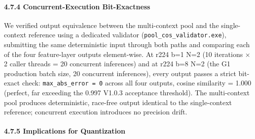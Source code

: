 \documentclass[
]{article}
\begin{document}
\paragraph{4.7.4 Concurrent-Execution
Bit-Exactness}\label{474-concurrent-execution-bit-exactness}

We verified output equivalence between the multi-context pool and the
single-context reference using a dedicated validator
(\texttt{pool\_cos\_validator.exe}), submitting the same deterministic
input through both paths and comparing each of the four feature-layer
outputs element-wise. At r224 b=1 N=2 (10 iterations × 2 caller threads
= 20 concurrent inferences) and at r224 b=8 N=2 (the G1 production batch
size, 20 concurrent inferences), every output passes a strict bit-exact
check: \texttt{max\_abs\_error\ =\ 0} across all four outputs, cosine
similarity = 1.000 (perfect, far exceeding the 0.997 V1.0.3 acceptance
threshold). The multi-context pool produces deterministic, race-free
output identical to the single-context reference; concurrent execution
introduces no precision drift.

\paragraph{4.7.5 Implications for
Quantization}\label{475-implications-for-quantization}
\end{document}
